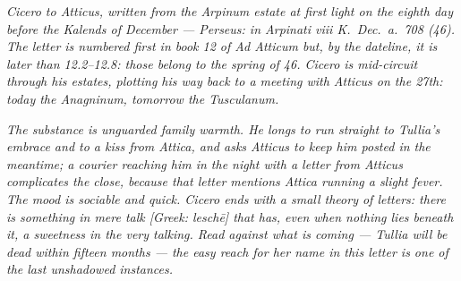 
\textit{Cicero to Atticus, written from the Arpinum estate at first
light on the eighth day before the Kalends of December ---
Perseus: \textit{in Arpinati viii K.~Dec.~a.~708 (46)}. The letter
is numbered first in book 12 of \textit{Ad Atticum} but, by the
dateline, it is later than 12.2--12.8: those belong to the spring
of 46. Cicero is mid-circuit through his estates, plotting his way
back to a meeting with Atticus on the 27th: today the Anagninum,
tomorrow the Tusculanum.}

\textit{The substance is unguarded family warmth. He longs to run
straight to Tullia's embrace and to a kiss from Attica, and asks
Atticus to keep him posted in the meantime; a courier reaching
him in the night with a letter from Atticus complicates the close,
because that letter mentions Attica running a slight fever. The
mood is sociable and quick. Cicero ends with a small theory of
letters: there is something in mere talk \textit{[Greek:
lesch\=e]} that has, even when nothing lies beneath it, a sweetness
in the very talking. Read against what is coming --- Tullia will
be dead within fifteen months --- the easy reach for her name in
this letter is one of the last unshadowed instances.}
